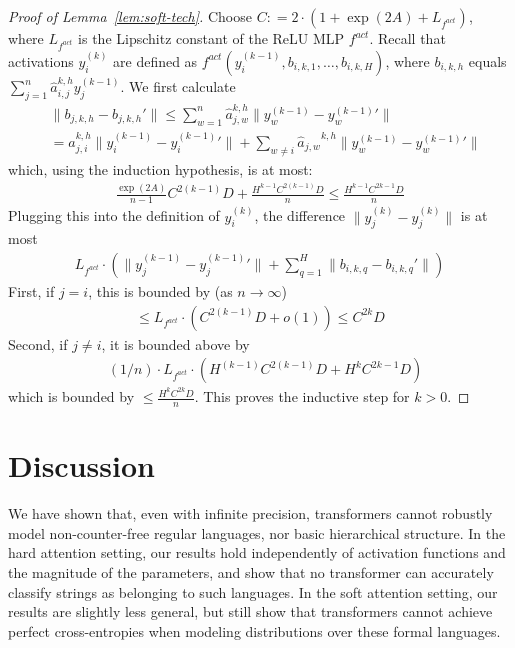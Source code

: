 \documentclass[11pt,a4paper]{article}
\begin{document}
\begin{proof}[Proof of Lemma~\ref{lem:soft-tech}]
Choose $C : = 2\cdot (1 + \exp(2A) + L_{f^{act}})$, where $L_{f^{act}}$ is the Lipschitz constant of the ReLU MLP $f^{act}$. 
Recall that activations $y_i^{(k)}$ are defined as $f^{act}(y_i^{(k-1)}, b_{i,k,1}, \dots, b_{i,k,H})$, where $b_{i,k,h}$ equals $\sum_{j=1}^n \hat{a}_{i,j}^{k,h} y_j^{(k-1)}$.
We first calculate
\begin{align*}
& \|b_{j,k,h} - b_{j,k,h}'\|  \leq \sum_{w=1}^n \hat{a}_{j,w}^{k,h} \|y_w^{(k-1)} - {{y}_w^{(k-1)}}'\|
\\
& = \hat{a}_{j,i}^{k,h} \|y_i^{(k-1)} - {{y}_i^{(k-1)}}'\|  + \sum_{w \neq i} {\hat{a}_{j,w}}^{k,h} \|y_w^{(k-1)} - {{y}_w^{(k-1)}}'\|
\end{align*}
which, using the induction hypothesis, is at most:
\begin{align*}
\frac{\exp(2A)}{n-1}  C^{2(k-1)} D + \frac{H^{k-1}C^{2(k-1)}D}{n} \leq \frac{H^{k-1} C^{2k-1} D}{n}
\end{align*}
Plugging this into the definition of $y_i^{(k)}$, the difference $\|y_j^{(k)} - {y_j^{(k)}}\|$ is at most
\begin{align*}
	L_{f^{act}} \cdot \left(\|y_j^{(k-1)}-{y_j^{(k-1)}}'\| + \sum_{q=1}^H \|b_{i,k,q} - b_{i,k,q}'\|\right)
\end{align*}
First, if $j= i$, this is bounded by (as $n \rightarrow \infty$)
\begin{align*}
\leq L_{f^{act}} \cdot \left(C^{2(k-1)}D + o(1)\right) \leq C^{2k}D
\end{align*}
Second, if $j\neq i$, it is bounded above by
\begin{align*}
	&  (1/n) \cdot L_{f^{act}} \cdot \left(H^{(k-1)} C^{2(k-1)}D + H^{k} C^{2k-1} D\right)
\end{align*} 
which is bounded by $\leq  \frac{H^{k} C^{2k} D}{n}$.
This proves the inductive step for $k>0$.
\end{proof}




\section{Discussion}\label{sec:discussion}

We have shown that, even with infinite precision, transformers cannot robustly model non-counter-free regular languages, nor basic hierarchical structure.
In the hard attention setting, our results hold independently of activation functions and the magnitude of the parameters, and show that no transformer   can accurately classify strings as belonging to such languages.
In the soft attention setting, our results are slightly less general, but still show that transformers cannot achieve perfect cross-entropies when modeling distributions over these formal languages.
\end{document}
